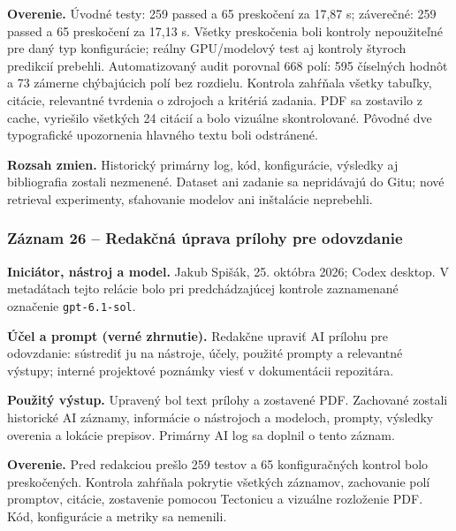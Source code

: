 \par\noindent \textbf{Overenie.} Úvodné testy: 259 passed a 65 preskočení za 17,87 s; záverečné: 259 passed a 65 preskočení za 17,13 s. Všetky preskočenia boli kontroly nepoužiteľné pre daný typ konfigurácie; reálny GPU/modelový test aj kontroly štyroch predikcií prebehli. Automatizovaný audit porovnal 668 polí: 595 číselných hodnôt a 73 zámerne chýbajúcich polí bez rozdielu. Kontrola zahŕňala všetky tabuľky, citácie, relevantné tvrdenia o zdrojoch a kritériá zadania. PDF sa zostavilo z cache, vyriešilo všetkých 24 citácií a bolo vizuálne skontrolované. Pôvodné dve typografické upozornenia hlavného textu boli odstránené.\par\smallskip
\par\noindent \textbf{Rozsah zmien.} Historický primárny log, kód, konfigurácie, výsledky aj bibliografia zostali nezmenené. Dataset ani zadanie sa nepridávajú do Gitu; nové retrieval experimenty, sťahovanie modelov ani inštalácie neprebehli.\par\smallskip
{}\subsubsection*{Záznam 26 -- Redakčná úprava prílohy pre odovzdanie}
\par\noindent \textbf{Iniciátor, nástroj a model.} Jakub Spišák, 25. októbra 2026; Codex desktop. V metadátach tejto relácie bolo pri predchádzajúcej kontrole zaznamenané označenie \texttt{gpt-\allowbreak{}6.\allowbreak{}1-\allowbreak{}sol}.\par\smallskip
\par\noindent \textbf{Účel a prompt (verné zhrnutie).} Redakčne upraviť AI prílohu pre odovzdanie: sústrediť ju na nástroje, účely, použité prompty a relevantné výstupy; interné projektové poznámky viesť v dokumentácii repozitára.\par\smallskip
\par\noindent \textbf{Použitý výstup.} Upravený bol text prílohy a zostavené PDF. Zachované zostali historické AI záznamy, informácie o nástrojoch a modeloch, prompty, výsledky overenia a lokácie prepisov. Primárny AI log sa doplnil o tento záznam.\par\smallskip
\par\noindent \textbf{Overenie.} Pred redakciou prešlo 259 testov a 65 konfiguračných kontrol bolo preskočených. Kontrola zahŕňala pokrytie všetkých záznamov, zachovanie polí promptov, citácie, zostavenie pomocou Tectonicu a vizuálne rozloženie PDF. Kód, konfigurácie a metriky sa nemenili.\par\smallskip
\endgroup
